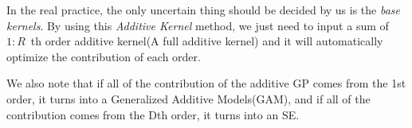 In the real practice, the only uncertain thing should be decided by us is the \emph{base kernels}.
By using this \emph{Additive Kernel} method, we just need to input a sum of $1:R$~th order additive kernel(A full additive kernel) and it will automatically optimize the contribution of each order.

We also note that if all of the contribution of the additive GP comes from the 1st order, it turns into a Generalized Additive Models(GAM)\cite{hastie1990generalized}, and if all of the contribution comes from the Dth order, it turns into an SE.















